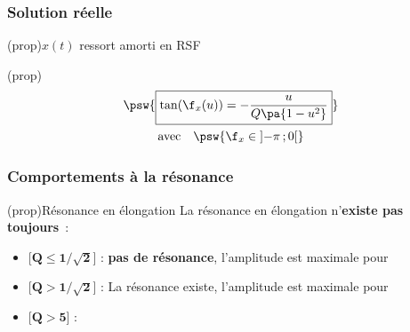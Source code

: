 \documentclass[../../main/main.tex]{subfiles}
\begin{document}
\vspace{-15pt}
\subsubsection{Solution réelle}
\begin{tcb}(prop){$x(t)$ ressort amorti en RSF}
	\smallbreak
	\begin{isd}[interior hidden, sidebyside align=top](prop)
		\vspace{-15pt}
		\psw{%
			\[
				\boxed{
					X(u)
					= \abs{\Xu}
					= \frac{F_0/k}{
						\sqrt{ \pa{1 - u^2} ^2 + \pa{\dfrac{u}{Q}}^2}}
				}
			\]
		}%
		\vspace{-15pt}
		\tcblower
		\vspace{-15pt}
		\begin{gather*}
			\psw{%
				\boxed{\tan(\f_x(u)) = - \frac{u}{Q \pa{1 - u^2}}}
			}%
			\\\text{avec}
			\quad
			\psw{%
			\f_x \in \left] -\pi\,; 0 \right[
			}%
		\end{gather*}
		\vspace{-15pt}
	\end{isd}
\end{tcb}

\subsubsection{Comportements à la résonance}

\begin{tcb*}[breakable](prop){Résonance en élongation}
	La résonance en élongation n'\textbf{existe pas toujours}~:
	\begin{itemize}[leftmargin=60pt]
		\item{}[$\mathbf{Q \leq 1/\sqrt{2}}$] :
		      \textbf{pas de résonance}, l'amplitude est maximale pour
		      \psw{%
			      \[\boxed{u = 0 \qet X(0) = \frac{F_0}{k}}\]
		      }%
		      \vspace{-15pt}
		\item{}[$\mathbf{Q > 1/\sqrt{2}}$] :
		      La résonance existe, l'amplitude est maximale pour
		      \psw{%
			      \[
				      \boxed{u_r = \frac{1}{Q} \sqrt{Q^{2} - \frac{1}{2}} < 1}
				      \qet
				      \boxed{X(u_r) = \frac{QF_0/k}{\sqrt{1 - \frac{1}{4Q^{2}}}}}
			      \]
		      }%
		      \vspace{-15pt}
		\item{}[$\mathbf{Q > 5}$] :
		      \leavevmode\vspace*{-15pt}\relax
		      \vspace{-15pt}
	\end{itemize}
\end{tcb*}
\end{document}
